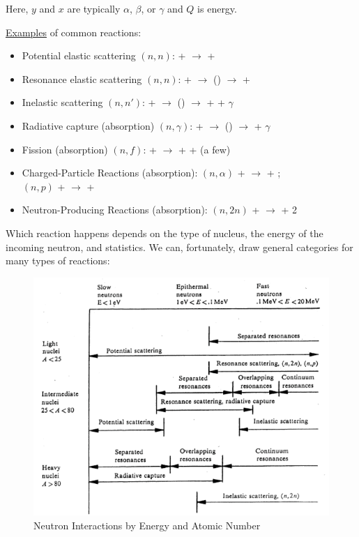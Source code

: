 \documentclass[12pt]{article}
\begin{document}
Here, $y$ and $x$ are typically $\alpha$, $\beta$, or $\gamma$ and $Q$ is
energy.

\underline{Examples} of common reactions:
\begin{itemize}
\item Potential elastic scattering $(n,n)$:  + 
      $\rightarrow$  + 
\item Resonance elastic scattering $(n,n)$:  + 
      $\rightarrow$ () $\rightarrow$  + 
\item Inelastic scattering $(n,n')$:  +  $\rightarrow$
      () $\rightarrow$  +  + $\gamma$
\item Radiative capture (absorption) $(n,\gamma)$:  + 
      $\rightarrow$ () $\rightarrow$  + $\gamma$
\item Fission (absorption) $(n,f)$:  +  $\rightarrow$
       +  + (a few)
\item Charged-Particle Reactions (absorption): $(n,\alpha)$  +
       $\rightarrow$  + ; \\
      \hspace*{17 em}$(n,p)$   +  $\rightarrow$
       + 
\item Neutron-Producing Reactions (absorption): $(n,2n)$ +
       $\rightarrow$  + 2
\end{itemize}

Which reaction happens depends on the type of nucleus, the energy of the 
incoming neutron, and statistics. We can, fortunately, draw general categories 
for many types of reactions:

\begin{figure}[h!]
    \begin{center}
    \includegraphics[keepaspectratio, width = 5 in]{reactionenergy}
    \caption{Neutron Interactions by Energy and Atomic Number}
    \label{fig:reactions}
    \end{center}
\end{figure}
\end{document}
